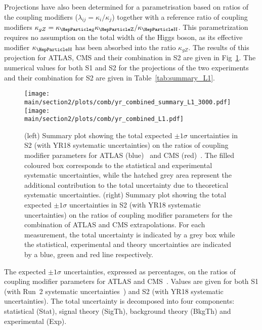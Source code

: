 Projections have also been determined for a parametrisation based on ratios of the coupling modifiers ($\lambda_{ij} = \kappa_{i}/\kappa_{j}$) together with a reference ratio of coupling modifiers $\kappa_{gZ} = \kglu\kZ/\kH$.
This parametrization requires no assumption on the total width of the Higgs boson, as its effective modifier $\kH$ has been absorbed into the ratio $\kappa_{gZ}$. The results of this projection for ATLAS, CMS and their combination in S2 are given in Fig~\ref{fig:summary_L1}.
The numerical values for both S1 and S2 for the projections of the two experiments and their combination for S2 are given in Table~\ref{tab:summary_L1}.
\begin{figure}[hbtp]
\centering
\texttt{[image: \\main/section2/plots/comb/yr\_combined\_summary\_L1\_3000.pdf]}%
\texttt{[image: \\main/section2/plots/comb/yr\_combined\_L1.pdf]}%
\caption{(left) Summary plot showing the total expected $\pm 1\sigma$ uncertainties in S2 (with YR18 systematic uncertainties) on the ratios of coupling modifier parameters  for ATLAS (blue)~\cite{ATL-PHYS-PUB-2018-054} and CMS (red)~\cite{CMS-PAS-FTR-18-011}. The filled coloured box corresponds to the statistical and experimental systematic uncertainties, while the hatched grey area represent the additional contribution to the total uncertainty due to theoretical systematic uncertainties.
(right) Summary plot showing the total expected $\pm 1\sigma$  uncertainties in S2 (with YR18 systematic uncertainties) on the ratios of coupling modifier parameters  for the combination of ATLAS and CMS extrapolations. For each measurement,  the total uncertainty is indicated by a grey box while the statistical, experimental and theory uncertainties are indicated by a blue, green and red line respectively.}
\label{fig:summary_L1}
\end{figure}


\begin{table}[hbtp]
\centering
\caption{The expected $\pm 1\sigma$ uncertainties, expressed as percentages, on the ratios of coupling modifier parameters for ATLAS and CMS~\cite{ATL-PHYS-PUB-2018-054,CMS-PAS-FTR-18-011}.  Values are given for both S1 (with Run~2 systematic uncertainties~\cite{Sirunyan:2018koj}) and S2 (with YR18 systematic uncertainties). The total uncertainty is decomposed into four components: statistical (Stat), signal theory (SigTh), background theory (BkgTh) and experimental (Exp).}
\small
\hspace{0.5cm}

\label{tab:summary_L1}
\vspace{0.5cm}
\end{table}
